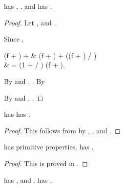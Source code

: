 \documentclass[b5paper, english, oneside]{memoir}
\begin{document}
\begin{theorem}
\label{TranslationInvarianceIsImplied}
 has , , and    has .
\end{theorem}

\begin{proof}
Let , and .

\proofpart{}
Since ,
\begin{eqs}
(f + \beta) + \alpha & \leq (f + \beta) + \alpha ((f + \beta) / \beta) \\
{} & = (1 + \alpha / \beta) (f + \beta).
\end{eqs}
By  and , . By  

\proofpart{}
By  and , .

\end{proof}





\begin{theorem}
\label{ExtensibilityIsImplied}
 has    has .
\end{theorem}

\begin{proof}
This follows from  by , , and . 
\end{proof}

\begin{theorem}
\label{SubsetSumIsImplied}
 has primitive properties.    has .
\end{theorem}

\begin{proof}
This is proved in .
\end{proof}

\begin{theorem}
\label{SubsetSumImpliesSubComposability}
 has ,  and .    has .
\end{theorem}
\end{document}
